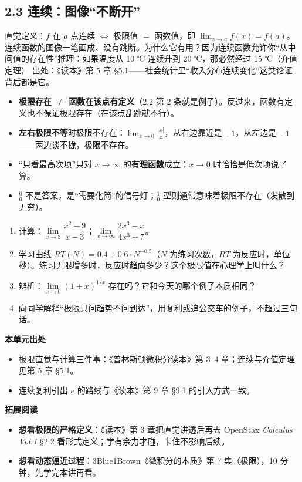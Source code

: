 \documentclass[UTF8,a4paper,11pt]{ctexart}
\newcommand{\src}[1]{%
  {\small\colorbox{refbg}{\color{refaccent}出处：#1}}}
\begin{document}
\subsection*{2.3 连续：图像“不断开”}

直觉定义：$f$ 在 $a$ 点连续 $\iff$ 极限值 $=$ 函数值，即 $\lim_{x\to a}f(x)=f(a)$。连续函数的图像一笔画成、没有跳断。为什么它有用？因为连续函数允许你“从中间值的存在性”推理：如果温度从 10 ℃ 连续升到 20 ℃，那必然经过 15 ℃（介值定理）\src{《读本》第 5 章 §5.1}——社会统计里“收入分布连续变化”这类论证背后都是它。

\begin{calcbox}[易错点与失效边界]
\begin{itemize}
  \item \textbf{极限存在 $\neq$ 函数在该点有定义}（2.2 第 2 条就是例子）。反过来，函数有定义也不保证极限存在（在该点乱跳就不行）。
  \item \textbf{左右极限不等}时极限不存在：$\lim_{x\to 0}\tfrac{|x|}{x}$，从右边靠近是 $+1$，从左边是 $-1$——两边谈不拢，极限不存在。
  \item “只看最高次项”只对 $x\to\infty$ 的\textbf{有理函数}成立；$x\to 0$ 时恰恰是低次项说了算。
  \item $\tfrac{0}{0}$ 不是答案，是“需要化简”的信号灯；$\tfrac{1}{0}$ 型则通常意味着极限不存在（发散到无穷）。
\end{itemize}
\end{calcbox}

\begin{exercise}[今日自测]
\begin{enumerate}
  \item 计算：$\lim\limits_{x\to 3}\dfrac{x^2-9}{x-3}$；$\lim\limits_{x\to\infty}\dfrac{2x^3-x}{4x^3+7}$。
  \item 学习曲线 $RT(N)=0.4+0.6\cdot N^{-0.5}$（$N$ 为练习次数，$RT$ 为反应时，单位秒）。练习无限增多时，反应时趋向多少？这个极限值在心理学上叫什么？
  \item 辨析：$\lim\limits_{x\to 0}(1+x)^{1/x}$ 存在吗？它和今天的哪个例子本质相同？
  \item 向同学解释“极限只问趋势不问到达”，用复利或追公交车的例子，不超过三句话。
\end{enumerate}
\end{exercise}

\begin{reading}
\textbf{本单元出处}
\begin{itemize}
  \item 极限直觉与计算三件事：《普林斯顿微积分读本》第 3–4 章；连续与介值定理见第 5 章 §5.1。
  \item 连续复利引出 $e$ 的路线与《读本》第 9 章 §9.1 的引入方式一致。
\end{itemize}
\textbf{拓展阅读}
\begin{itemize}
  \item \textbf{想看极限的严格定义}：《读本》第 3 章把直觉讲透后再去 OpenStax \emph{Calculus Vol.1} §2.2 看形式定义；学有余力才碰，卡住不影响后续。
  \item \textbf{想看动态逼近过程}：3Blue1Brown《微积分的本质》第 7 集（极限），10 分钟，先学完本讲再看。
\end{itemize}
\end{reading}
\end{document}
